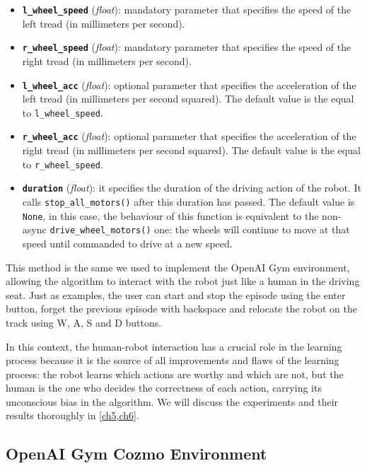 \begin{itemize}
	\item \textbf{\texttt{l\_wheel\_speed}} (\textit{float}): mandatory parameter that specifies the speed of the left tread (in millimeters per second).
	\item \textbf{\texttt{r\_wheel\_speed}} (\textit{float}): mandatory parameter that specifies the speed of the right tread (in millimeters per second).
	\item \textbf{\texttt{l\_wheel\_acc}} (\textit{float}): optional parameter that specifies the acceleration of the left tread (in millimeters per second squared). The default value is the equal to \texttt{l\_wheel\_speed}.
	\item \textbf{\texttt{r\_wheel\_acc}} (\textit{float}): optional parameter that specifies the acceleration of the right tread (in millimeters per second squared).  The default value is the equal to \texttt{r\_wheel\_speed}.
	\item \textbf{\texttt{duration}} (\textit{float}): it specifies the duration of the driving action of the robot. It calls \texttt{stop\_all\_motors()} after this duration has passed. The default value is \texttt{None}, in this case, the behaviour of this function is equivalent to the non-async \texttt{drive\_wheel\_motors()} one: the wheels will continue to move at that speed until commanded to drive at a new speed.
\end{itemize}

This method is the same we used to implement the OpenAI Gym environment, allowing the algorithm to interact with the robot just like a human in the driving seat. Just as examples, the user can start and stop the episode using the enter button, forget the previous episode with backspace and relocate the robot on the track using W, A, S and D buttons.

In this context, the human-robot interaction has a crucial role in the learning process because it is the source of all improvements and flaws of the learning process: the robot learns which actions are worthy and which are not, but the human is the one who decides the correctness of each action, carrying its unconscious bias in the algorithm. We will discuss the experiments and their results thoroughly in \vref{ch5,ch6}.

\subsection{OpenAI Gym Cozmo Environment}

